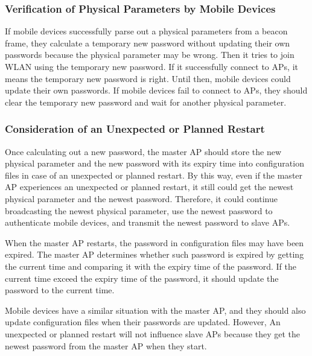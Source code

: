 \subsubsection{Verification of Physical Parameters by Mobile Devices}
If mobile devices successfully parse out a physical parameters from a beacon frame, they calculate a temporary new password without updating their own passwords because the physical parameter may be wrong. Then it tries to join WLAN using the temporary new password. If it successfully connect to APs, it means the temporary new password is right. Until then, mobile devices could update their own passwords. If mobile devices fail to connect to APs, they should clear the temporary new password and wait for another physical parameter. 

\subsubsection{Consideration of an Unexpected or Planned Restart}
Once calculating out a new password, the master AP should store the new physical parameter and the new password with its expiry time into configuration files in case of an unexpected or planned restart. By this way, even if the master AP experiences an unexpected or planned restart, it still could get the newest physical parameter and the newest password. Therefore, it could continue broadcasting the newest physical parameter, use the newest password to authenticate mobile devices, and transmit the newest password to slave APs. 

When the master AP restarts, the password in configuration files may have been expired. The master AP determines whether such password is expired by getting the current time and comparing it with the expiry time of the password. If the current time exceed the expiry time of the password, it should update the password to the current time. 

Mobile devices have a similar situation with the master AP, and they should also update configuration files when their passwords are updated. However, An unexpected or planned restart will not influence slave APs because they get the newest password from the master AP when they start. 
